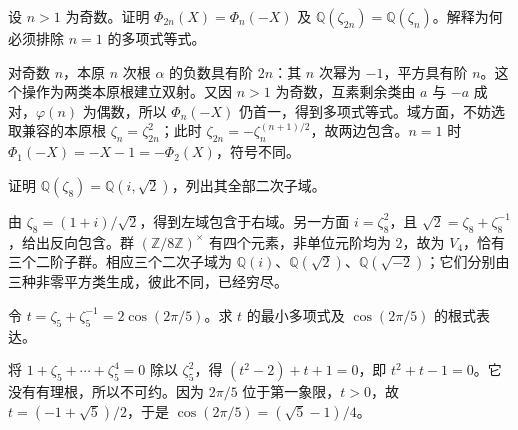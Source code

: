 \begin{exercise}\label{b1:ex:21-2}
	设 \(n>1\) 为奇数。证明 \(\Phi_{2n}(X)=\Phi_n(-X)\) 及 \(\mathbb Q(\zeta_{2n})=\mathbb Q(\zeta_n)\)。解释为何必须排除 \(n=1\) 的多项式等式。
\end{exercise}
\begin{solution}
	对奇数 \(n\)，本原 \(n\) 次根 \(\alpha\) 的负数具有阶 \(2n\)：其 \(n\) 次幂为 \(-1\)，平方具有阶 \(n\)。这个操作为两类本原根建立双射。又因 \(n>1\) 为奇数，互素剩余类由 \(a\) 与 \(-a\) 成对，\(\varphi(n)\) 为偶数，所以 \(\Phi_n(-X)\) 仍首一，得到多项式等式。域方面，不妨选取兼容的本原根 \(\zeta_n=\zeta_{2n}^2\)；此时 \(\zeta_{2n}=-\zeta_n^{(n+1)/2}\)，故两边包含。\(n=1\) 时 \(\Phi_1(-X)=-X-1=-\Phi_2(X)\)，符号不同。
\end{solution}

\begin{exercise}\label{b1:ex:21-3}
	证明 \(\mathbb Q(\zeta_8)=\mathbb Q(i,\sqrt2)\)，列出其全部二次子域。
\end{exercise}
\begin{solution}
	由 \(\zeta_8=(1+i)/\sqrt2\)，得到左域包含于右域。另一方面 \(i=\zeta_8^2\)，且 \(\sqrt2=\zeta_8+\zeta_8^{-1}\)，给出反向包含。群 \((\mathbb Z/8\mathbb Z)^\times\) 有四个元素，非单位元阶均为 \(2\)，故为 \(V_4\)，恰有三个二阶子群。相应三个二次子域为 \(\mathbb Q(i)\)、\(\mathbb Q(\sqrt2)\)、\(\mathbb Q(\sqrt{-2})\)；它们分别由三种非零平方类生成，彼此不同，已经穷尽。
\end{solution}

\begin{exercise}\label{b1:ex:21-4}
	令 \(t=\zeta_5+\zeta_5^{-1}=2\cos(2\pi/5)\)。求 \(t\) 的最小多项式及 \(\cos(2\pi/5)\) 的根式表达。
\end{exercise}
\begin{solution}
	将 \(1+\zeta_5+\cdots+\zeta_5^4=0\) 除以 \(\zeta_5^2\)，得 \((t^2-2)+t+1=0\)，即 \(t^2+t-1=0\)。它没有有理根，所以不可约。因为 \(2\pi/5\) 位于第一象限，\(t>0\)，故 \(t=(-1+\sqrt5)/2\)，于是 \(\cos(2\pi/5)=(\sqrt5-1)/4\)。
\end{solution}

